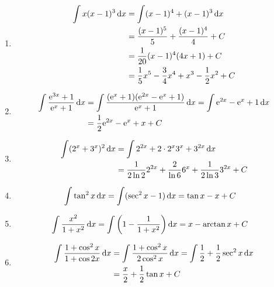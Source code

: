 \begin{solution}
    \begin{enumerate}
        \item \begin{align*}
                  \int x(x-1)^3 \operatorname{d\!} x & = \int (x-1)^4 + (x-1)^3 \operatorname{d\!} x                                 \\
                                       & = \frac{(x-1)^5}{5} + \frac{(x-1)^4}{4} + C                     \\
                                       & = \frac{1}{20}(x-1)^4 (4x+1) + C                                \\
                                       & = \frac{1}{5} x^5 - \frac{3}{4} x^4 + x^3 - \frac{1}{2} x^2 + C
              \end{align*}
        \item \begin{align*}
                  \int \frac{\mathrm{e}^{3x} + 1}{\mathrm{e}^x + 1} \operatorname{d\!} x & = \int \frac{(\mathrm{e}^x + 1)(\mathrm{e}^{2x} - \mathrm{e}^x + 1)}{\mathrm{e}^x + 1} \operatorname{d\!} x = \int \mathrm{e}^{2x} - \mathrm{e}^x + 1 \operatorname{d\!} x \\
                                                           & = \frac{1}{2} \mathrm{e}^{2x} - \mathrm{e}^x + x + C
              \end{align*}
        \item \begin{align*}
                  \int (2^x + 3^x)^2 \operatorname{d\!} x & = \int 2^{2x} + 2 \cdot 2^x 3^x + 3^{2x} \operatorname{d\!} x                                 \\
                                            & = \frac{1}{2 \ln 2} 2^{2x} + \frac{2}{\ln 6} 6^x + \frac{1}{2 \ln 3} 3^{2x} + C
              \end{align*}
        \item \begin{align*}
                  \int \tan^2 x \operatorname{d\!} x & = \int (\sec^2 x - 1) \operatorname{d\!} x = \tan x - x + C
              \end{align*}
        \item \begin{align*}
                  \int \frac{x^2}{1 + x^2} \operatorname{d\!} x & = \int \left(1 - \frac{1}{1 + x^2}\right) \operatorname{d\!} x = x - \arctan x + C
              \end{align*}
        \item \begin{align*}
                  \int \frac{1 + \cos^2 x}{1 + \cos 2x} \operatorname{d\!} x & = \int \frac{1 + \cos^2 x}{2 \cos^2 x} \operatorname{d\!} x = \int \frac{1}{2} + \frac{1}{2} \sec^2 x \operatorname{d\!} x \\
                                                               & = \frac{x}{2} + \frac{1}{2} \tan x + C
              \end{align*}
    \end{enumerate}
\end{solution}

